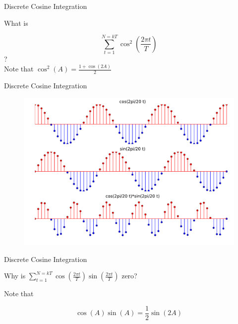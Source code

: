 \documentclass{beamer}
\begin{document}
\begin{frame}{Discrete Cosine Integration}

What is 

\[ \sum_{t=1}^{N=kT} \cos^2(\frac{2 \pi t}{T}) \]
?\\

Note that $\cos^2(A) = \frac{1 + \cos(2A)}{2}$

\end{frame}

\begin{frame}{Discrete Cosine Integration}

\begin{figure}[t]
    \includegraphics[width=\textwidth]{cossin.pdf}
\end{figure}

\end{frame}

\begin{frame}{Discrete Cosine Integration}

Why is $\sum_{t=1}^{N=kT} \cos(\frac{2 \pi t}{T}) \sin(\frac{2 \pi t}{T})$ zero?

Note that 

\[ \cos(A) \sin(A) = \frac{1}{2} \sin(2A) \]


\end{frame}
\end{document}
